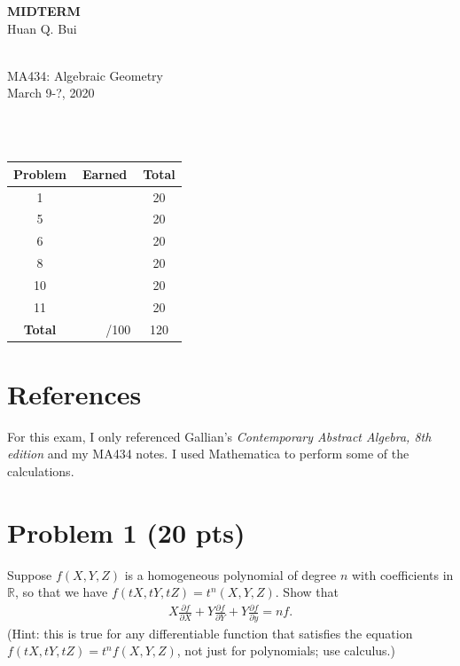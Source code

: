 \documentclass[12pt]{article}
\newcommand{\p}{\partial}
\newcommand{\f}[2]{\frac{#1}{#2}}
\begin{document}
\begin{center}
	\LARGE{\textbf{MIDTERM}}
	\\
	\large{Huan Q. Bui}
	
	\noindent \hrulefill\\
	\small{MA434: Algebraic Geometry}\\
	\small{March 9-?, 2020}\\\vspace{-6pt}
	\hrulefill
\end{center}


$\,$\\
$\,$\\


\begin{center}
\begin{tabular}{|c|c|c|}
	\hline
	Problem & Earned & Total\\
	\hline
	1&&20\\
	\hline
	5&&20\\
	\hline
	6&&20\\
	\hline
	8&&20\\
	\hline
	10&&20\\
	\hline
	11&&20\\
	\hline
	\textbf{Total}&$\,\quad\quad$/100&120\\
	\hline
\end{tabular}
\end{center}

\newpage



\section*{References}

For this exam, I only referenced Gallian's \textit{Contemporary Abstract Algebra, 8th edition} and my MA434 notes. I used Mathematica to perform some of the calculations. 



\newpage




\section*{Problem 1 \small{(20 pts)}}
Suppose $f(X,Y,Z)$ is a homogeneous polynomial of degree $n$ with coefficients in $\mathbb{R}$, so that we have $f(tX,tY,tZ) = t^n(X,Y,Z)$. Show that
\begin{align*}
X\f{\p f}{\p X} + Y\f{\p f}{\p Y} + Y\f{\p f}{\p y}  = nf.
\end{align*}
(Hint: this is true for any differentiable function that satisfies the equation $f(tX,tY,tZ) = t^n f(X,Y,Z)$, not just for polynomials; use calculus.)\\
\end{document}
